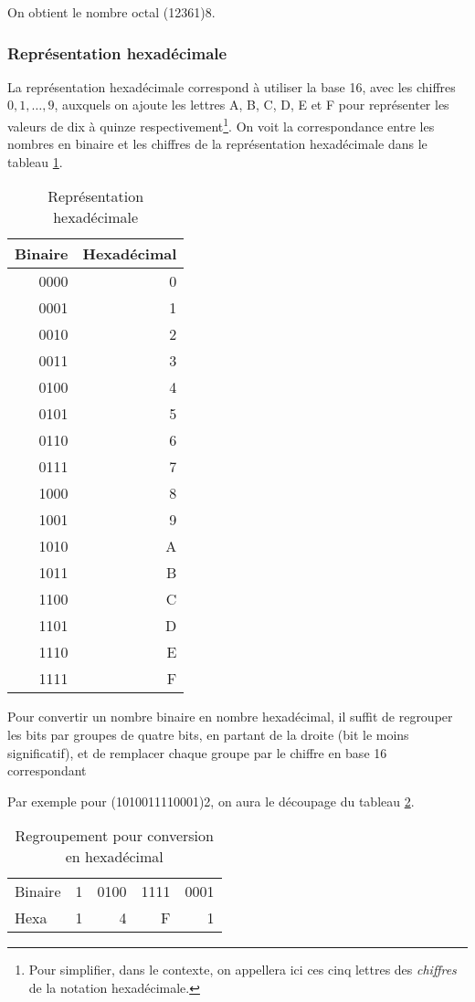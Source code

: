 \documentclass[11pt]{article}
\begin{document}
On obtient le nombre octal (12361)8.

\subsubsection{Représentation hexadécimale}
\label{sec:org771aae3}

La représentation hexadécimale correspond à utiliser la base 16, avec
les chiffres \(0, 1, \ldots, 9\), auxquels on ajoute les lettres A, B,
C, D, E et F pour représenter les valeurs de dix à quinze
respectivement\footnote{Pour simplifier, dans le contexte, on appellera ici ces cinq
lettres des \emph{chiffres} de la notation hexadécimale.}. On voit la correspondance entre les nombres en binaire et les chiffres de la représentation hexadécimale dans le tableau \ref{tab:org12c20cb}.

\begin{table}[htbp]
\caption{\label{tab:org12c20cb}Représentation hexadécimale}
\centering
\begin{tabular}{rr}
Binaire & Hexadécimal\\
\hline
0000 & 0\\
0001 & 1\\
0010 & 2\\
0011 & 3\\
0100 & 4\\
0101 & 5\\
0110 & 6\\
0111 & 7\\
1000 & 8\\
1001 & 9\\
1010 & A\\
1011 & B\\
1100 & C\\
1101 & D\\
1110 & E\\
1111 & F\\
\end{tabular}
\end{table}


Pour convertir un nombre binaire en nombre hexadécimal, il suffit de
regrouper les bits par groupes de quatre bits, en partant de la droite
(bit le moins significatif), et de remplacer chaque groupe par le
chiffre en base 16 correspondant

Par exemple pour (1010011110001)2, on aura le découpage du tableau
\ref{tab:orgc8a16f6}.

\begin{table}[htbp]
\caption{\label{tab:orgc8a16f6}Regroupement pour conversion en hexadécimal}
\centering
\begin{tabular}{lrrrr}
 &  &  &  & \\
\hline
Binaire & 1 & 0100 & 1111 & 0001\\
Hexa & 1 & 4 & F & 1\\
\end{tabular}
\end{table}
\end{document}
